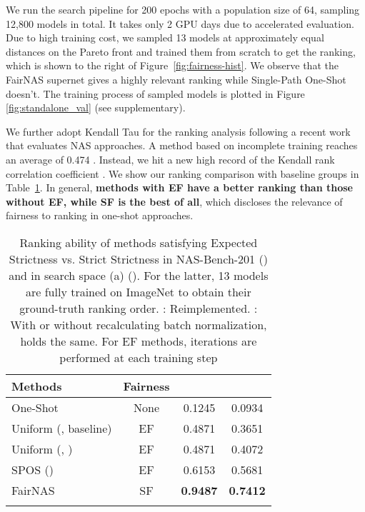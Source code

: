 \documentclass[10pt,twocolumn,letterpaper]{article}
\theoremstyle{definition}
\begin{document}
We run the search pipeline for 200 epochs with a population size of 64, sampling 12,800 models in total. It takes only 2 GPU days due to accelerated evaluation. Due to high training cost, we sampled 13 models at approximately equal distances on the Pareto front and trained them from scratch to get the ranking, which is shown to the right of Figure~\ref{fig:fairness-hist}. We observe that the FairNAS supernet gives a highly relevant ranking while Single-Path One-Shot \cite{guo2019single} doesn't. The training process of sampled models is plotted in Figure \ref{fig:standalone_val} (see supplementary).












We further adopt Kendall Tau \cite{kendall1938new} for the ranking analysis following a recent work \cite{sciuto2019evaluating} that evaluates NAS approaches. A method based on incomplete training reaches an average  of 0.474 \cite{zheng2019multi}.
Instead, we hit a new high record of the Kendall rank correlation coefficient . We show our ranking comparison with baseline groups in Table~\ref{tab:kendall-tau}. In general,  \textbf{methods with EF have a better ranking than those without EF, while SF is the best of all}, which discloses the relevance of fairness to ranking in one-shot approaches.


\setlength{\tabcolsep}{4pt}
\begin{table}
	\centering
		\begin{small}
			\begin{tabular}{|l|*{3}{c|}} 			
\hline
Methods & Fairness &   & \\
\hline
One-Shot \cite{bender2018understanding} & None & 0.1245 & 0.0934\\
				Uniform (, baseline) & EF & 0.4871 & 0.3651 \\
				Uniform (, ) & EF & 0.4871 & 0.4072 \\
				SPOS \cite{guo2019single} () & EF & 0.6153 &0.5681 \\
FairNAS & SF & \textbf{0.9487} & \textbf{0.7412} \\
\hline
				\noalign{\smallskip}
			\end{tabular}
		\end{small}
	\caption{Ranking ability of methods satisfying Expected Strictness vs. Strict Strictness in NAS-Bench-201 () and in search space (a) (). For the latter, 13 models are fully trained on ImageNet to obtain their ground-truth ranking order.  : Reimplemented. : With or without recalculating batch normalization,  holds the same. For EF methods,  iterations are performed at each training step}
	\label{tab:kendall-tau}
\end{table}
\end{document}
